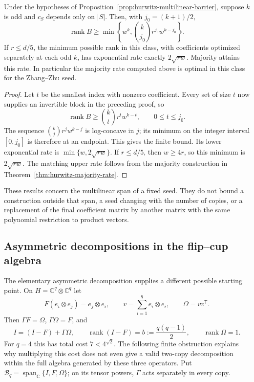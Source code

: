 \begin{corollary}
\label{cor:hurwitz-symmetric-optimal}
Under the hypotheses of Proposition~\ref{prop:hurwitz-multilinear-barrier},
suppose $k$ is odd and $c_S$ depends only on $|S|$. Then, with
$j_0=(k+1)/2$,
\[
 \operatorname{rank}B\ge
 \min\left\{w^k,\binom{k}{j_0}r^{j_0}w^{k-j_0}\right\}.
\]
If $r\le d/5$, the minimum possible rank in this class, with
coefficients optimized separately at each odd $k$, has exponential
rate exactly $2\sqrt{rw}$. Majority attains this rate. In particular
the majority rate computed above is optimal in this class for the
Zhang--Zhu seed.
\end{corollary}

\begin{proof}
Let $t$ be the smallest index with nonzero coefficient. Every set of
size $t$ now supplies an invertible block in the preceding proof, so
\[
 \operatorname{rank}B\ge\binom{k}{t}r^t w^{k-t},\qquad0\le t\le j_0.
\]
The sequence $\binom{k}{j}r^j w^{k-j}$ is log-concave in $j$;
its minimum on the integer interval $[0,j_0]$ is therefore at an
endpoint. This gives the finite bound. Its lower exponential rate is
$\min\{w,2\sqrt{rw}\}$. If $r\le d/5$, then $w\ge4r$, so this
minimum is $2\sqrt{rw}$. The matching upper rate follows from the
majority construction in Theorem~\ref{thm:hurwitz-majority-rate}.
\end{proof}

These results concern the multilinear span of a fixed seed. They do
not bound a construction outside that span, a seed changing with the
number of copies, or a replacement of the final coefficient matrix
by another matrix with the same polynomial restriction to product
vectors.

\subsection{Asymmetric decompositions in the flip--cup algebra}
\label{subsec:flip-cup}

The elementary asymmetric decomposition supplies a different possible
starting point. On $H=\mathbb C^q\otimes\mathbb C^q$ let
\[
 F(e_i\otimes e_j)=e_j\otimes e_i,\qquad
 v=\sum_{i=1}^q e_i\otimes e_i,\qquad \Omega=vv^{\mathsf T}.
\]
Then $\Gamma F=\Omega$, $\Gamma\Omega=F$, and
\[
 I=(I-F)+\Gamma\Omega,\qquad
 \operatorname{rank}(I-F)=b:=\frac{q(q-1)}2,\qquad
 \operatorname{rank}\Omega=1.
\]
For $q=4$ this has total cost $7<4^{\sqrt2}$. The following finite
obstruction explains why multiplying this cost does not even give a
valid two-copy decomposition within the full algebra generated by
these three operators. Put
$\mathcal B_q=\operatorname{span}_{\mathbb C}\{I,F,\Omega\}$;
on its tensor powers, $\Gamma$ acts separately in every copy.

